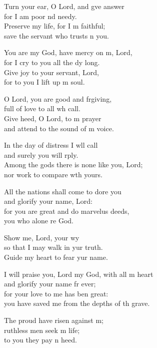\begin{psalmverse}
  \begin{patverse}
Turn your ear, O Lord, and g\pointup{\i}ve answer\Med\\
for I am poor nd needy.\\
Preserve my life, for I m faithful;\Med\\
save the servant who trusts n you.

You are my God, have mercy on m, Lord,\Med\\
for I cry to you all the dy long.\\
Give joy to your servant,  Lord,\Med\\
for to you I lift up m soul.

O Lord, you are good and frgiving,\Med\\
full of love to all wh call.\\
Give heed, O Lord, to m prayer\Med\\
and attend to the sound of m voice.

In the day of distress I w\pointup{\i}ll call\Med\\
and surely you will rply.\\
Among the gods there is none like you,  Lord;\Med\\
nor work to compare w\pointup{\i}th yours.

All the nations shall come to dore you\Med\\
and glorify your name,  Lord:\\
for you are great and do marvelus deeds,\Med\\
you who alone re God.

Show me, Lord, your wy\Flex\\
so that I may walk in yur truth.\Med\\
Guide my heart to fear yur name.

I will praise you, Lord my God, with all m heart\Med\\
and glorify your name fr ever;\\
for your love to me has ben great:\Med\\
you have saved me from the depths of th grave.

The proud have risen against m;\Flex\\
ruthless men seek m life;\Med\\
to you they pay n heed.


\end{patverse}
\end{psalmverse}
